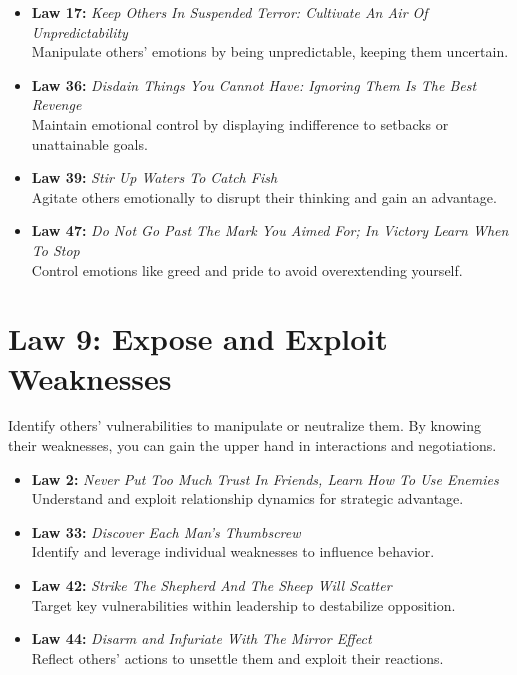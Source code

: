 \documentclass[a4paper,10.8pt]{article}
\begin{document}
\begin{itemize}[leftmargin=*, label={--}]
    \item \textbf{Law 17:} \textit{Keep Others In Suspended Terror: Cultivate An Air Of Unpredictability} \\
    Manipulate others' emotions by being unpredictable, keeping them uncertain.
    
    \item \textbf{Law 36:} \textit{Disdain Things You Cannot Have: Ignoring Them Is The Best Revenge} \\
    Maintain emotional control by displaying indifference to setbacks or unattainable goals.
    
    \item \textbf{Law 39:} \textit{Stir Up Waters To Catch Fish} \\
    Agitate others emotionally to disrupt their thinking and gain an advantage.
    
    \item \textbf{Law 47:} \textit{Do Not Go Past The Mark You Aimed For; In Victory Learn When To Stop} \\
    Control emotions like greed and pride to avoid overextending yourself.
\end{itemize}

\section*{Law 9: Expose and Exploit Weaknesses}
Identify others' vulnerabilities to manipulate or neutralize them. By knowing their weaknesses, you can gain the upper hand in interactions and negotiations.

\begin{itemize}[leftmargin=*, label={--}]
    \item \textbf{Law 2:} \textit{Never Put Too Much Trust In Friends, Learn How To Use Enemies} \\
    Understand and exploit relationship dynamics for strategic advantage.
    
    \item \textbf{Law 33:} \textit{Discover Each Man's Thumbscrew} \\
    Identify and leverage individual weaknesses to influence behavior.
    
    \item \textbf{Law 42:} \textit{Strike The Shepherd And The Sheep Will Scatter} \\
    Target key vulnerabilities within leadership to destabilize opposition.
    
    \item \textbf{Law 44:} \textit{Disarm and Infuriate With The Mirror Effect} \\
    Reflect others' actions to unsettle them and exploit their reactions.
\end{itemize}
\end{document}
